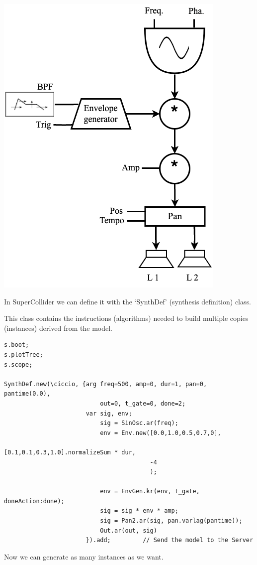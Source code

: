 \begin{center}
\includegraphics[scale=0.35]{../img/modello.png}
\end{center}

In SuperCollider we can define it with the `SynthDef' (synthesis definition) class.

This class contains the instructions (algorithms) needed to build multiple copies (instances) derived from the model.

\begin{lstlisting}[frame=single] 
s.boot;
s.plotTree;
s.scope;

SynthDef.new(\ciccio, {arg freq=500, amp=0, dur=1, pan=0, pantime(0.0), 
                           out=0, t_gate=0, done=2;
                       var sig, env;
                           sig = SinOsc.ar(freq);
                           env = Env.new([0.0,1.0,0.5,0.7,0],                
                                         [0.1,0.1,0.3,1.0].normalizeSum * dur, 
                                         -4    
                                         );

                           env = EnvGen.kr(env, t_gate, doneAction:done);
                           sig = sig * env * amp;
                           sig = Pan2.ar(sig, pan.varlag(pantime));
                           Out.ar(out, sig)
                       }).add;         // Send the model to the Server
\end{lstlisting}
Now we can generate as many instances as we want.

